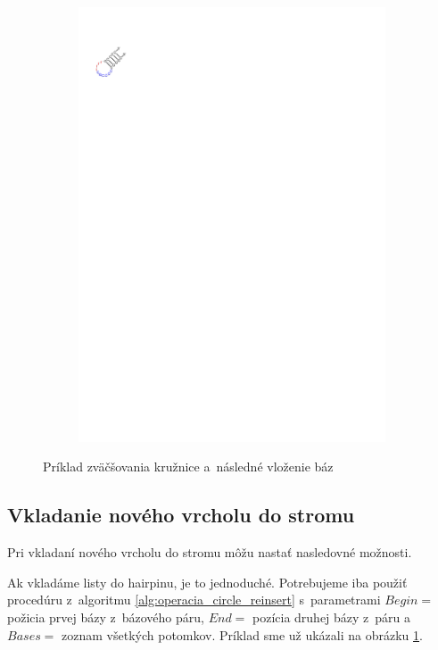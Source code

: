 \begin{figure}
\begin{subfigure}{\wi}
    \includegraphics[trim=1cm 24.5cm 17.5cm 2.5cm]{../img/alg/insert/1/circle-big-end}
  \end{subfigure}

  \caption{Príklad zväčšovania kružnice a~následné vloženie báz}
  \label{obr:insert_circle_hairpin}
\end{figure}





\subsection{Vkladanie nového vrcholu do stromu}

Pri vkladaní nového vrcholu do stromu môžu nastať nasledovné možnosti.

Ak vkladáme listy do hairpinu, je to jednoduché. Potrebujeme iba použiť
procedúru z~algoritmu \ref{alg:operacia_circle_reinsert}
s~parametrami $Begin = $ požicia prvej bázy z~bázového páru, $End = $ pozícia
druhej bázy z~páru a~$Bases = $ zoznam všetkých potomkov.
Príklad sme už ukázali na obrázku \ref{obr:insert_circle_hairpin}.

